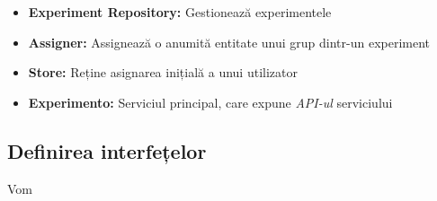 \begin{itemize}
	\item \textbf{Experiment Repository:} Gestionează experimentele
	\item \textbf{Assigner:} Assignează o anumită entitate unui grup dintr-un experiment
	\item \textbf{Store:} Reține asignarea inițială a unui utilizator
	\item \textbf{Experimento:} Serviciul principal, care expune \textit{API-ul} serviciului 
\end{itemize}

\begin{remark}
	
\end{remark}

\subsection{Definirea interfețelor}

Vom 
